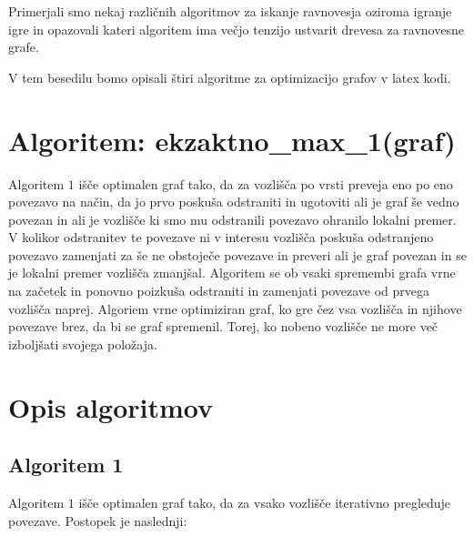 \documentclass[fin1, tisk]{fmfdelo}
\begin{document}
Primerjali smo nekaj različnih algoritmov za iskanje ravnovesja oziroma igranje igre
in opazovali kateri algoritem ima večjo tenzijo ustvarit drevesa za ravnovesne grafe.


V tem besedilu bomo opisali štiri algoritme za optimizacijo grafov v latex kodi.

\section{Algoritem: ekzaktno\_max\_1(graf)}

Algoritem $1$ išče optimalen graf tako, da za vozlišča po vrsti preveja eno po eno
povezavo na način, da jo prvo poskuša odstraniti in ugotoviti ali je graf še vedno
povezan in ali je vozlišče ki smo mu odstranili povezavo ohranilo lokalni premer.
V kolikor odstranitev te povezave ni v interesu vozlišča poskuša odstranjeno povezavo
zamenjati za še ne obstoječe povezave in preveri ali je graf povezan in se je lokalni
premer vozlišča zmanjšal. Algoritem se ob vsaki spremembi grafa vrne na začetek in
ponovno poizkuša odstraniti in zamenjati povezave od prvega vozlišča naprej.
Algoriem vrne optimiziran graf, ko gre čez vsa vozlišča in njihove povezave brez,
da bi se graf spremenil. Torej, ko nobeno vozlišče ne more več izboljšati svojega položaja.


\section*{Opis algoritmov}

\subsection*{Algoritem 1}

Algoritem $1$ išče optimalen graf tako, da za vsako vozlišče iterativno pregleduje povezave. Postopek je naslednji:
\end{document}
